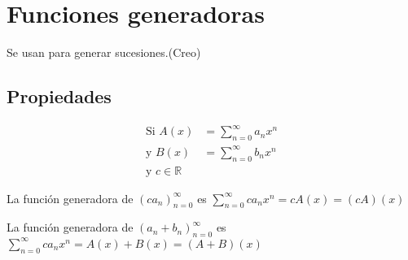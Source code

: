\documentclass[../main.tex]{subfiles}
\begin{document}
\chapter{Funciones generadoras}%

\thispagestyle{fancy}

Se usan para generar sucesiones.(Creo)

\section{Propiedades}%
\label{sec:propiedades}

\begin{align*}
	\text{Si } A(x) &=
	\sum_{n=0}^\infty a_nx^n\\
	\text{y } B(x) &=
	\sum_{n=0}^\infty b_nx^n\\
	\text{y } c \in\mathbb{R}
\end{align*}

La función generadora de $\left(ca_n\right)^\infty_{n=0}$
es $\sum_{n=0}^\infty ca_nx^n=cA(x)=(cA)(x)$

La función generadora de $(a_n+b_n)^\infty_{n=0}$
es $\sum_{n=0}^\infty ca_nx^n=A(x)+B(x)=(A+B)(x)$
\end{document}
